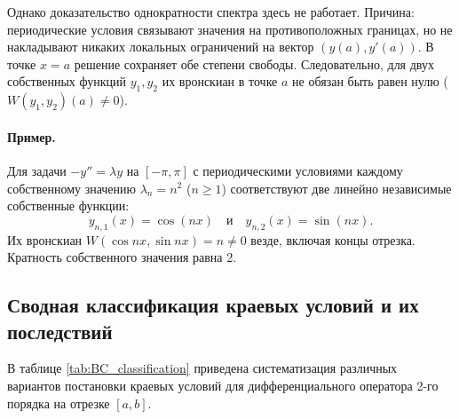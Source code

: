 \documentclass[12pt,a4paper]{article}
\begin{document}
Однако доказательство однократности спектра здесь не работает.
Причина: периодические условия связывают значения на противоположных границах, но не накладывают никаких локальных ограничений на вектор $(y(a), y'(a))$. В точке $x = a$ решение сохраняет обе степени свободы. Следовательно, для двух собственных функций $y_1, y_2$ их вронскиан в точке $a$ не обязан быть равен нулю ($W(y_1, y_2)(a) \neq 0$).

\paragraph{Пример.} Для задачи $-y'' = \lambda y$ на $[-\pi, \pi]$ с периодическими условиями каждому собственному значению $\lambda_n = n^2$ ($n \ge 1$) соответствуют две линейно независимые собственные функции:
\begin{equation*}
    y_{n, 1}(x) = \cos(nx) \quad \text{и} \quad y_{n, 2}(x) = \sin(nx).
\end{equation*}
Их вронскиан $W(\cos nx, \sin nx) = n \neq 0$ везде, включая концы отрезка. Кратность собственного значения равна 2.

\subsection{Сводная классификация краевых условий и их последствий}

В таблице \ref{tab:BC_classification} приведена систематизация различных вариантов постановки краевых условий для дифференциального оператора 2-го порядка на отрезке $[a, b]$.
\end{document}

